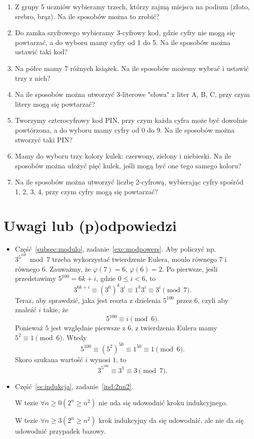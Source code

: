 \documentclass[12pt]{article}
\begin{document}
\begin{enumerate}
	\item 
	Z grupy 5 uczniów wybieramy trzech, którzy zajmą miejsca na podium (złoto, srebro, brąz). Na ile sposobów można to zrobić?
	\item 
	Do zamka szyfrowego wybieramy 3-cyfrowy kod, gdzie cyfry nie mogą się powtarzać, a do wyboru mamy cyfry od 1 do 5. Na ile sposobów można ustawić taki kod?
	\item 
	Na półce mamy 7 różnych książek. Na ile sposobów możemy wybrać i ustawić trzy z nich?
	\item 
	Na ile sposobów można utworzyć 3-literowe "słowa" z liter A, B, C, przy czym litery mogą się powtarzać?
	\item 
	Tworzymy czterocyfrowy kod PIN, przy czym każda cyfra może być dowolnie powtórzona, a do wyboru mamy cyfry od 0 do 9. Na ile sposobów można stworzyć taki PIN?
	\item 
	Mamy do wyboru trzy kolory kulek: czerwony, zielony i niebieski. Na ile sposobów można ułożyć pięć kulek, jeśli mogą być one tego samego koloru?
	\item 
	Na ile sposobów można utworzyć liczbę 2-cyfrową, wybierając cyfry spośród 1, 2, 3, 4, przy czym cyfry mogą się powtarzać?
\end{enumerate} 



\section{Uwagi lub (p)odpowiedzi}


\begin{itemize}
	\item Część~\ref{subsec:modulo}, zadanie~\ref{exc:modpowers}.
	Aby policzyć np. $3^{5^100} \bmod 7$ trzeba wykorzystać 
	twierdzenie Eulera, moulo równego $7$ i równego $6$.
	Zauważmy, że $\varphi(7)=6$, $\varphi(6)=2$.
	Po pierwsze, jeśli przedstawimy $5^{100} = 6k+i$, gdzie $0\leq i<6$, to 
	\[
	3^{6k+i} \equiv (3^6)^k3^i \equiv 1^k3^i \equiv 3^i \pmod 7.
	\]
	Teraz, aby sprawdzić, jaka jest reszta z dzielenia $5^100$ przez $6$, czyli aby znaleźć $i$ takie, że 
	\[
	5^{100}\equiv i \pmod 6.
	\]
	Ponieważ $5$ jest względnie pierwsze z $6$, z twierdzenia Eulera mamy $5^2 \equiv 1 \pmod 6$.
	Wtedy 
	\[
	5^100 \equiv (5^2)^{50} \equiv 1^{50} \equiv 1 \pmod 6.
	\]
	Skoro szukana wartość $i$ wynosi $1$, to 
	\[
	3^{5^100} \equiv 3^1 \equiv 3 \pmod 7.
	\]
    \item Część~\ref{ss:indukcja}, zadanie~\ref{ind:2nn2}. 
     
     W tezie $\forall n\geq 0 (2^n\geq n^2)$ nie uda się 
     udowodnić kroku indukcyjnego.
     
     W tezie $\forall n\geq 3 (2^n\geq n^2)$ krok indukcyjny da się udowodnić, ale nie da się udowodnić przypadek bazowy.
\end{itemize}



\end{document}
